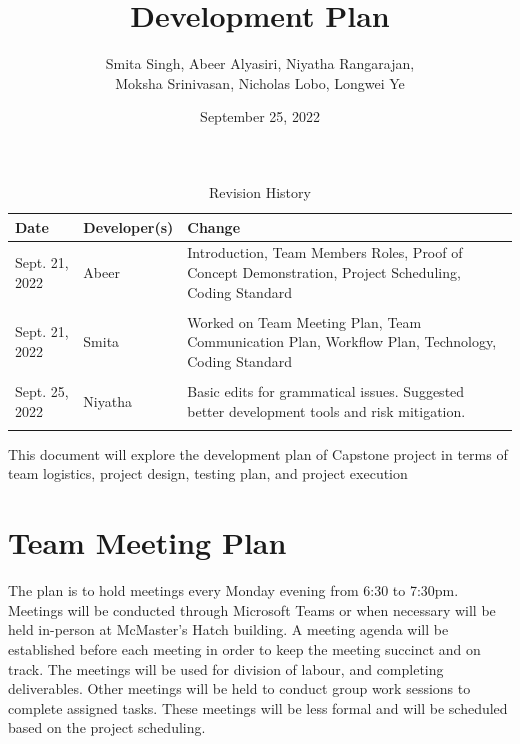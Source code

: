\documentclass{article}
\date{September 25, 2022}
\begin{document}
\title{Development Plan\\\prognam}

\author{Smita Singh, Abeer Alyasiri, Niyatha Rangarajan,\\ Moksha Srinivasan, Nicholas Lobo, Longwei Ye}

\begin{table}[hp]
\caption{Revision History} \label{TblRevisionHistory}
\begin{tabularx}{\textwidth}{llX}
\toprule
\textbf{Date} & \textbf{Developer(s)} & \textbf{Change}\\
\midrule
Sept. 21, 2022 & Abeer & Introduction, Team Members Roles, Proof of Concept Demonstration, Project Scheduling, Coding Standard \\\\
Sept. 21, 2022 & Smita & Worked on Team Meeting Plan, Team Communication Plan, Workflow Plan, Technology, Coding Standard\\\\
Sept. 25, 2022 & Niyatha & Basic edits for grammatical issues. Suggested better 
 development tools and risk mitigation.\\\\
\bottomrule
\end{tabularx}
\end{table}

\newpage

\maketitle

This document will explore the development plan of Capstone project in terms of team logistics, project design, testing plan, and project execution %

\section{Team Meeting Plan}
The plan is to hold meetings every Monday evening from 6:30 to 7:30pm. Meetings will be conducted through Microsoft Teams or when necessary will be held in-person at McMaster's Hatch building. A meeting agenda will be established before each meeting in order to keep the meeting succinct and on track. The meetings will be used for division of labour, and completing deliverables. %
Other meetings will be held to conduct group work sessions to complete assigned tasks. These meetings will be less formal and will be scheduled based on the project scheduling.
\end{document}
